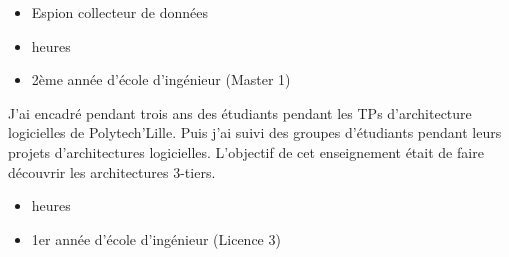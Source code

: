 \documentclass[10pt,a4paper,ragged2e,withhyper]{altacv}
\begin{document}
\divider

\begin{itemize}
  \item Espion collecteur de données
\end{itemize}
  











\begin{itemize}
\item {} heures
\item 2ème année d'école d'ingénieur (Master 1)
\end{itemize}

J'ai encadré pendant trois ans des étudiants pendant les TPs d'architecture logicielles de Polytech'Lille.
Puis j'ai suivi des groupes d'étudiants pendant leurs projets d'architectures logicielles.
L'objectif de cet enseignement était de faire découvrir les architectures 3-tiers.

\divider

\begin{itemize}
\item {} heures
\item 1er année d'école d'ingénieur (Licence 3)
\end{itemize}
\end{document}
